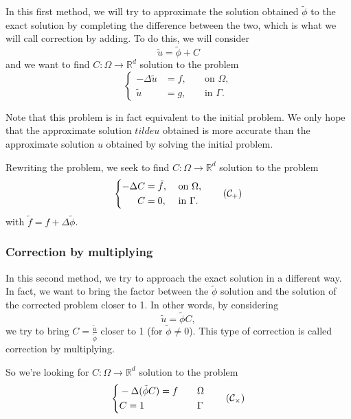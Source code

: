 In this first method, we will try to approximate the solution obtained $\tilde{\phi}$ to the exact solution by completing the difference between the two, which is what we will call correction by adding. To do this, we will consider
\begin{equation*}
	\tilde{u}=\tilde{\phi}+C
\end{equation*}
and we want to find $C: \Omega \rightarrow \mathbb{R}^d$ solution to the problem
\begin{equation*}
	\left\{\begin{aligned}
		-\Delta \tilde{u}&=f, \; &&\text{on } \Omega, \\
		\tilde{u}&=g, \; &&\text{in } \Gamma.
	\end{aligned}\right.
\end{equation*}
\begin{Rem}
	Note that this problem is in fact equivalent to the initial  problem. We only hope that the approximate solution $tilde{u}$ obtained is more accurate than the approximate solution $u$ obtained by solving the initial problem.
\end{Rem}
Rewriting the problem, we seek to find $C: \Omega \rightarrow \mathbb{R}^d$ solution to the problem
\begin{equation}
\label{eq.corr.pbc_add}
\left\{\begin{aligned}
	-\Delta C&=\tilde{f}, \; &&\text{on } \Omega, \\
	C&=0, \; &&\text{in } \Gamma.
\end{aligned}\right. \tag{$\mathcal{C}_{+}$}
\end{equation}
with $\tilde{f}=f+\Delta\tilde{\phi}$.

\subsubsection{Correction by multiplying} \label{Corr.method.mult}

In this second method, we try to approach the exact solution in a different way. In fact, we want to bring the factor between the $\tilde{\phi}$ solution and the solution of the corrected problem closer to 1. In other words, by considering 
\begin{equation*}
	\tilde{u}=\tilde{\phi}C,
\end{equation*}
we try to bring $C=\frac{\tilde{u}}{\tilde{\phi}}$ closer to 1 (for $\tilde{\phi}\ne 0$). This type of correction is called correction by multiplying.

So we're looking for $C: \Omega \rightarrow \mathbb{R}^d$ solution to the problem
\begin{equation}
	\label{eq.corr.pbc_mult}
	\left\{\begin{aligned}
		&-\Delta (\tilde{\phi}C)=f \quad &&\Omega \\
		&C=1 \quad &&\Gamma
	\end{aligned}\right. \tag{$\mathcal{C}_\times$}
\end{equation}

